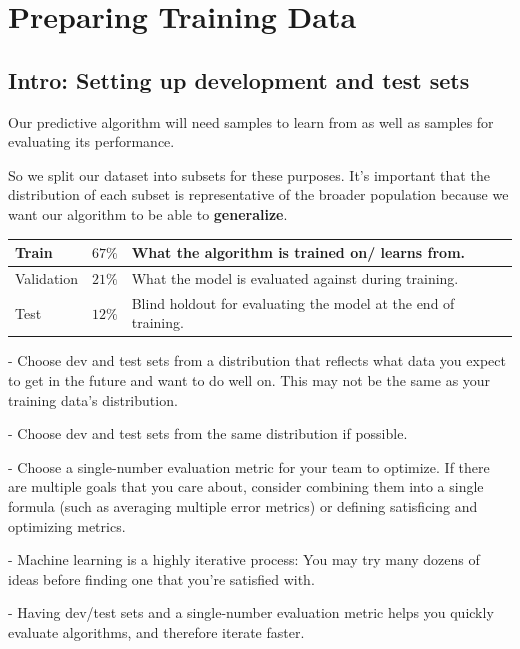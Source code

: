 \documentclass[openany]{book}
\begin{document}
\chapter{Preparing Training Data}



\section{Intro: Setting up development and
test sets}


Our predictive algorithm will need samples to learn from as well as samples for evaluating its performance.

So we split our dataset into subsets for these purposes. It's important that the distribution of each subset is representative of the broader population because we want our algorithm to be able to \textbf{generalize}. \\

\begin{tabular}{|l|l|l|}
\hline Train & $67 \%$ & What the algorithm is trained on/ learns from. \\
\hline Validation & $21 \%$ & What the model is evaluated against during training. \\
\hline Test & $12 \%$ & Blind holdout for evaluating the model at the end of training. \\
\hline
\end{tabular}

- Choose dev and test sets from a distribution that reflects what data you expect to get in the future and want to do well on. This may not be the same as your training data's distribution.

- Choose dev and test sets from the same distribution if possible.

- Choose a single-number evaluation metric for your team to optimize. If there are multiple goals that you care about, consider combining them into a single formula (such as averaging multiple error metrics) or defining satisficing and optimizing metrics.

- Machine learning is a highly iterative process: You may try many dozens of ideas before finding one that you're satisfied with.

- Having dev/test sets and a single-number evaluation metric helps you quickly evaluate algorithms, and therefore iterate faster.
\end{document}
